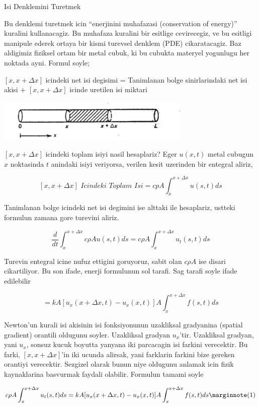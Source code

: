 \documentclass[12pt,fleqn]{article}\usepackage{../common}
\begin{document}
Isi Denklemini Turetmek 

Bu denklemi turetmek icin ``enerjinini muhafazasi (conservation of
energy)'' kuralini kullanacagiz. Bu muhafaza kuralini bir esitlige
cevirecegiz, ve bu esitligi manipule ederek ortaya bir kismi turevsel
denklem (PDE) cikaratacagiz. Baz aldigimiz fiziksel ortam bir metal cubuk,
ki bu cubukta materyel yogunlugu her noktada ayni.  Formul soyle;

$[x,x+\Delta x]$ icindeki net isi degisimi = Tanimlanan bolge
sinirlarindaki net isi akisi + $[x,x+\Delta x]$ icinde uretilen isi miktari

\includegraphics[height=2cm]{heat_1.png}

$[x,x+\Delta x]$ icindeki toplam isiyi nasil hesaplariz? Eger $u(x,t)$
metal cubugun $x$ noktasinda $t$ anindaki isiyi veriyorsa, verilen kesit
uzerinden bir entegral aliriz,

\[ [x,x+\Delta x] \textit{ Icindeki Toplam Isi} = 
cpA \int _{ x}^{x+\Delta x}u(s,t) ds
   \]

Tanimlanan bolge icindeki net isi degimini ise alttaki ile hesaplariz,
ustteki formulun zamana gore turevini aliriz. 


\[ \frac{d}{dt} \int _{ x}^{x+\Delta x} c\rho A u(s,t) ds = 
c\rho A  \int _{ x}^{x+\Delta x} u_t(s,t) ds
  \]


Turevin entegral icine nufuz ettigini goruyoruz, sabit olan $c\rho A$ ise
disari cikartiliyor. Bu son ifade, enerji formulunun sol tarafi. Sag tarafi
soyle ifade edilebilir

\[ = kA [ u_x(x+\Delta x,t) - u_x(x,t)] A \int _{x}^{x+\Delta x} f(s,t) ds \]

Newton'un kurali isi akisinin isi fonksiyonunun uzakliksal gradyanina
(spatial gradient) orantili oldugunu soyler. Uzakliksal gradyan
$u_x$'tir. Uzakliksal gradyan, yani $u_x$, sonsuz kucuk boyutta yanyana iki
parcacagin isi farkini verecektir. Bu farki, $[x,x+\Delta x]$'in iki ucunda
alirsak, yani farklarin farkini bize gereken orantiyi verecektir. Sezgizel
olarak bunun niye oldugunu anlamak icin fizik kaynaklarina basvurmak
faydali olabilir. Formulun tamami soyle

\[ c\rho A  \int _{ x}^{x+\Delta x} u_t(s,t) ds =
kA [ u_x(x+\Delta x,t) - u_x(x,t)] A \int _{x}^{x+\Delta x} f(s,t) ds 
\mlabel{1}
 \]
\end{document}
